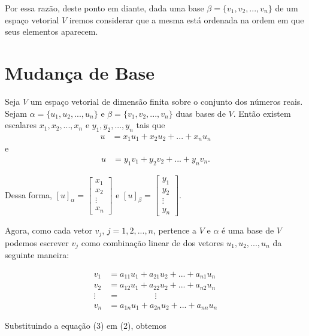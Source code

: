 \begin{enumerate}
Por essa razão, deste ponto em diante, dada uma base  $\beta=\{v_1, v_2,..., v_n \}$ de um espaço vetorial  $V$ iremos considerar que a mesma está ordenada na ordem em que seus elementos aparecem.


\end{enumerate}


\section{Mudança de Base}


Seja  $V$  um espaço vetorial de dimensão finita sobre o conjunto dos números reais. Sejam $\alpha=\{ u_1, u_2, ...,u_n\}$ e $\beta=\{v_1, v_2, ...,v_n\}$ duas bases de $V$. Então existem escalares $x_1, x_2, ...,x_n$ e $y_1, y_2,...,y_n$ tais que
\begin{align}
u&=x_1u_1+ x_2u_2+ ...+x_nu_n
\end{align}\label{eq1}
e
\begin{align}
u&=y_1v_1+ y_2v_2+ ...+y_nv_n.
\end{align}\label{eq2}


Dessa forma, $[u]_{\alpha}=\left[ \begin{array}{c}x_1 \\x_2 \\ \vdots \\ x_n\end{array}\right ]$ e $[u]_{\beta}=\left[ \begin{array}{c}y_1 \\y_2 \\ \vdots \\ y_n\end{array}\right ]$.


Agora, como cada vetor $v_j$, $j=1,2,...,n$, pertence a $V$ e $\alpha$ é uma base de $V$ podemos escrever $v_j$ como combinação linear de dos vetores $u_1, u_2, ...,u_n$ da seguinte maneira:

\begin{align}
v_1&=a_{11}u_1+ a_{21}u_2+ ...+a_{n1}u_n  \nonumber \\
v_2&=a_{12}u_1+ a_{22}u_2+ ...+a_{n2}u_n \nonumber \\
\vdots&=\; \;\;  \; \;\; \; \;\;\; \;\;\; \;\; \vdots \\
v_n&=a_{1n}u_1+ a_{2n}u_2+ ...+a_{nn}u_n \nonumber
\end{align}\label{eq3}

Substituindo a equação (3)  em (2), obtemos

